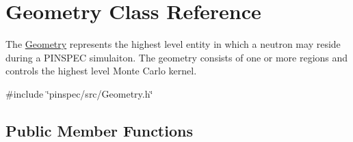 \hypertarget{classGeometry}{\section{Geometry Class Reference}
\label{classGeometry}
}


The \hyperlink{classGeometry}{Geometry} represents the highest level entity in which a neutron may reside during a P\-I\-N\-S\-P\-E\-C simulaiton. The geometry consists of one or more regions and controls the highest level Monte Carlo kernel.  




{\ttfamily \#include \char`\"{}pinspec/src/\-Geometry.\-h\char`\"{}}

\subsection*{Public Member Functions}
